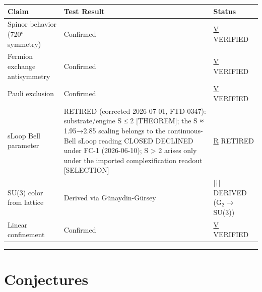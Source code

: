 \documentclass[
  11pt,
  letterpaper,
  twoside,
  openright]{book}
\begin{document}
\begin{longtable}[]{@{}
  >{\raggedright\arraybackslash}p{}
  >{\raggedright\arraybackslash}p{}
  >{\raggedright\arraybackslash}p{}@{}}
\toprule\noalign{}
\begin{minipage}[b]{\linewidth}\raggedright
Claim
\end{minipage} & \begin{minipage}[b]{\linewidth}\raggedright
Test Result
\end{minipage} & \begin{minipage}[b]{\linewidth}\raggedright
Status
\end{minipage} \\
\midrule\noalign{}
\endhead
\bottomrule\noalign{}
\endlastfoot
Spinor behavior (720° symmetry) & Confirmed & \hyperref[v]{V}
VERIFIED \\
Fermion exchange antisymmetry & Confirmed & \hyperref[v]{V} VERIFIED \\
Pauli exclusion & Confirmed & \hyperref[v]{V} VERIFIED \\
sLoop Bell parameter & RETIRED (corrected 2026-07-01, FTD-0347):
substrate/engine S ≤ 2 {[}THEOREM{]}; the S ≈ 1.95→2.85 scaling belongs
to the continuous-Bell sLoop reading CLOSED DECLINED under FC-1
(2026-06-10); S \textgreater{} 2 arises only under the imported
complexification readout {[}SELECTION{]} & \hyperref[r]{R} RETIRED \\
SU(3) color from lattice & Derived via Günaydin-Gürsey & {[}†{]} DERIVED
(G₂ → SU(3)) \\
Linear confinement & Confirmed & \hyperref[v]{V} VERIFIED \\
\end{longtable}

\begin{center}\rule{0.5\linewidth}{0.5pt}\end{center}

\section{Conjectures}\label{conjectures}
\end{document}
